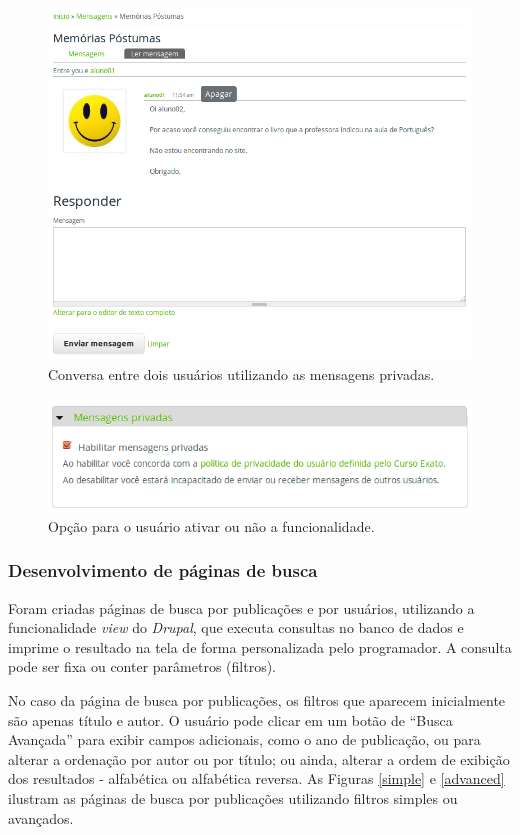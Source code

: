\documentclass[a4paper]{article}
\begin{document}
\begin{figure}[pbth!]
\centering
\caption{Conversa entre dois usuários utilizando as mensagens privadas.\label{privatemsg}}
\includegraphics[width=120mm]{img/privatemsg.png}
\end{figure}

\begin{figure}[pbth!]
\centering
\caption{Opção para o usuário ativar ou não a funcionalidade.\label{pvtmsg-config}}
\includegraphics[width=120mm]{img/privatemsg-config.png}
\end{figure}


\subsubsection{Desenvolvimento de páginas de busca}

Foram criadas páginas de busca por publicações e por usuários, utilizando a funcionalidade \textit{view} do \textit{Drupal}, que executa consultas no banco de dados e imprime o resultado na tela de forma personalizada pelo programador. A consulta pode ser fixa ou conter parâmetros (filtros). 

No caso da página de busca por publicações, os filtros que aparecem inicialmente são apenas título e autor. O usuário pode clicar em um botão de “Busca Avançada” para exibir campos adicionais, como o ano de publicação, ou para alterar a ordenação por autor ou por título; ou ainda, alterar a ordem de exibição dos resultados - alfabética ou alfabética reversa. As Figuras \ref{simple} e \ref{advanced} ilustram as páginas de busca por publicações utilizando filtros simples ou avançados.
\end{document}
